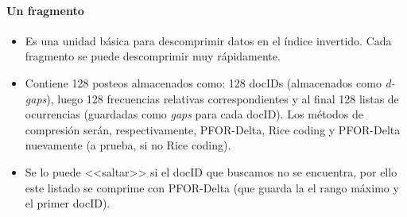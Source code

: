 \paragraph{Un fragmento}

\begin{itemize}

\item Es una unidad básica para descomprimir datos en el índice invertido. Cada fragmento se puede descomprimir muy rápidamente.

\item Contiene 128 posteos almacenados como: 128 docIDs (almacenados como \textit{d-gaps}), luego 128 frecuencias relativas correspondientes y al final 128 listas de ocurrencias (guardadas como \textit{gaps} para cada docID). Los métodos de compresión serán, respectivamente, PFOR-Delta, Rice coding y PFOR-Delta nuevamente (a prueba, si no Rice coding).

\item Se lo puede <<saltar>> si el docID que buscamos no se encuentra, por ello este listado se comprime con PFOR-Delta (que guarda la el rango  máximo y el primer docID).

\end{itemize}
